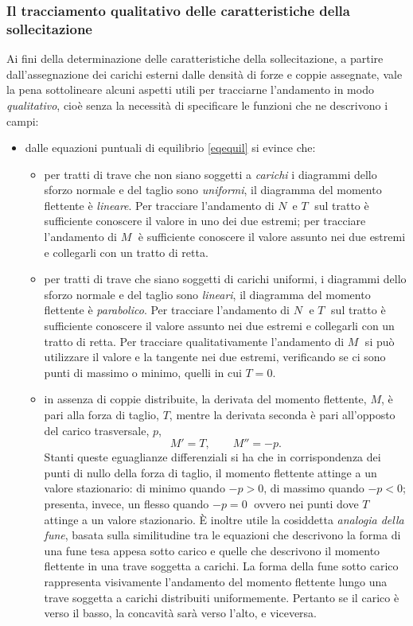 \subsubsection{Il tracciamento qualitativo delle caratteristiche della sollecitazione}
Ai fini della determinazione delle caratteristiche della sollecitazione, a partire  dall'assegnazione dei carichi esterni dalle densità di forze e coppie assegnate, vale la pena sottolineare alcuni aspetti utili per tracciarne l'andamento in modo \emph{qualitativo}, cioè senza la necessità di specificare le funzioni che ne descrivono i campi:
\begin{itemize}[]
	\item[{ a})] dalle equazioni  puntuali di equilibrio \eqref{eqequil} si evince che:
	\begin{itemize}
		\item per tratti di trave che non siano soggetti a  \emph{carichi}  i diagrammi dello sforzo normale e del taglio sono \emph{uniformi}, il diagramma del momento flettente è \emph{lineare}. 
		Per tracciare l'andamento di $N\,$ e $T\;$ sul tratto è sufficiente conoscere il valore in uno dei due estremi; per tracciare l'andamento di $M\;$ è sufficiente conoscere il valore assunto nei due estremi e collegarli con un tratto di retta.
		\item per tratti di trave che siano soggetti  di carichi uniformi, i diagrammi dello sforzo normale e del taglio sono \emph{lineari}, il diagramma del momento flettente è \emph{parabolico}.
		Per tracciare l'andamento di $N\;$ e $T\;$ sul tratto è sufficiente conoscere il valore assunto nei due estremi e collegarli con un tratto di retta.
		Per tracciare qualitativamente l'andamento di $M\;$  si può utilizzare il valore e la tangente nei due estremi, verificando se ci sono punti di massimo o minimo, quelli in cui $T=0$.
		\item in assenza di coppie distribuite,  la derivata del momento flettente, $M$, è pari alla forza di taglio, $T$, mentre  la derivata seconda è pari all'opposto del carico trasversale, $p$,\\
		\[M'=T,\qquad M''=-p.\] 
		Stanti queste eguaglianze differenziali si ha che in corrispondenza dei punti di nullo della forza di  taglio, il  momento flettente  attinge a un valore stazionario: di minimo quando $-p>0$, di massimo quando $-p<0$;  presenta, invece, un  flesso quando $-p=0\;$ ovvero  nei punti dove $T\;$ attinge a un valore stazionario.
		 È inoltre utile la cosiddetta \textit{analogia della fune},  basata sulla similitudine tra le equazioni che descrivono la forma di una fune tesa appesa sotto carico e quelle che descrivono il momento flettente in una trave soggetta a carichi. La forma della fune sotto carico rappresenta visivamente l'andamento del momento flettente lungo una trave soggetta a carichi distribuiti uniformemente. Pertanto se il carico è verso il basso, la concavità sarà verso l'alto, e viceversa. 

\end{itemize}
\end{itemize}
